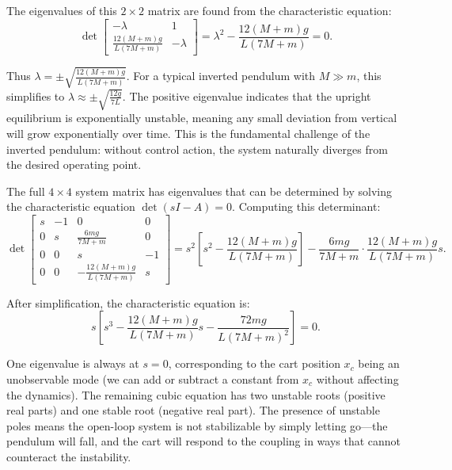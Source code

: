 The eigenvalues of this $2 \times 2$ matrix are found from the characteristic equation:
\begin{equation}
\det\begin{bmatrix} -\lambda & 1 \\ \frac{12(M + m)g}{L(7M + m)} & -\lambda \end{bmatrix} = \lambda^2 - \frac{12(M + m)g}{L(7M + m)} = 0.
\end{equation}

Thus $\lambda = \pm \sqrt{\frac{12(M + m)g}{L(7M + m)}}$. For a typical inverted pendulum with $M \gg m$, this simplifies to $\lambda \approx \pm \sqrt{\frac{12g}{7L}}$. The positive eigenvalue indicates that the upright equilibrium is exponentially unstable, meaning any small deviation from vertical will grow exponentially over time. This is the fundamental challenge of the inverted pendulum: without control action, the system naturally diverges from the desired operating point.

The full $4 \times 4$ system matrix has eigenvalues that can be determined by solving the characteristic equation $\det(sI - A) = 0$. Computing this determinant:
\begin{equation}
\det\begin{bmatrix}
s & -1 & 0 & 0 \\
0 & s & \frac{6mg}{7M + m} & 0 \\
0 & 0 & s & -1 \\
0 & 0 & -\frac{12(M + m)g}{L(7M + m)} & s
\end{bmatrix} = s^2 \left[s^2 - \frac{12(M + m)g}{L(7M + m)}\right] - \frac{6mg}{7M + m} \cdot \frac{12(M + m)g}{L(7M + m)} s.
\end{equation}

After simplification, the characteristic equation is:
\begin{equation}
s\left[s^3 - \frac{12(M + m)g}{L(7M + m)}s - \frac{72mg}{L(7M + m)^2}\right] = 0.
\end{equation}

One eigenvalue is always at $s = 0$, corresponding to the cart position $x_c$ being an unobservable mode (we can add or subtract a constant from $x_c$ without affecting the dynamics). The remaining cubic equation has two unstable roots (positive real parts) and one stable root (negative real part). The presence of unstable poles means the open-loop system is not stabilizable by simply letting go—the pendulum will fall, and the cart will respond to the coupling in ways that cannot counteract the instability.

